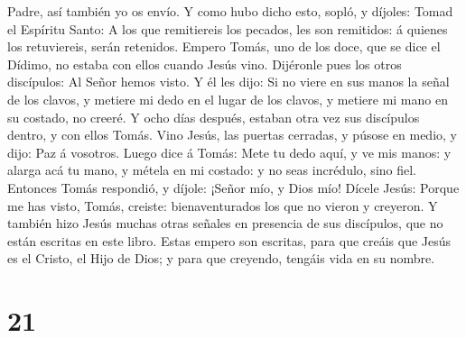 Padre, así también yo os envío.  Y como hubo dicho esto,
sopló, y díjoles: Tomad el Espíritu Santo:  A los que
remitiereis los pecados, les son remitidos: á quienes los retuviereis,
serán retenidos.  Empero Tomás, uno de los doce, que se
dice el Dídimo, no estaba con ellos cuando Jesús vino. 
Dijéronle pues los otros discípulos: Al Señor hemos visto. Y él les
dijo: Si no viere en sus manos la señal de los clavos, y metiere mi dedo
en el lugar de los clavos, y metiere mi mano en su costado, no creeré.
 Y ocho días después, estaban otra vez sus discípulos
dentro, y con ellos Tomás. Vino Jesús, las puertas cerradas, y púsose en
medio, y dijo: Paz á vosotros.  Luego dice á Tomás: Mete
tu dedo aquí, y ve mis manos: y alarga acá tu mano, y métela en mi
costado: y no seas incrédulo, sino fiel.  Entonces Tomás
respondió, y díjole: ¡Señor mío, y Dios mío!  Dícele
Jesús: Porque me has visto, Tomás, creiste: bienaventurados los que no
vieron y creyeron.  Y también hizo Jesús muchas otras
señales en presencia de sus discípulos, que no están escritas en este
libro.  Estas empero son escritas, para que creáis que
Jesús es el Cristo, el Hijo de Dios; y para que creyendo, tengáis vida
en su nombre.

\hypertarget{section-20}{%
\section{21}\label{section-20}}

